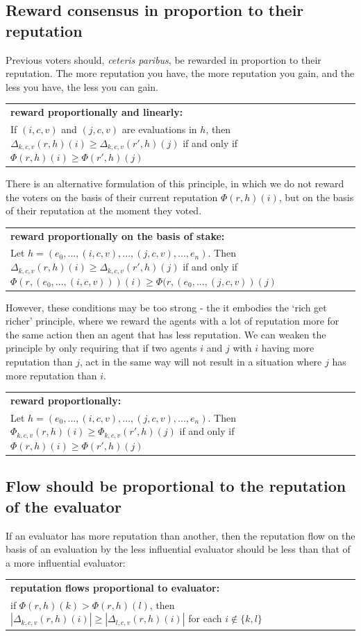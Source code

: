 \documentclass{article}
\newcommand{\flow}{\Phi}
\newenvironment{condition}[1]
	{
	\begin{center}
	   \begin{tabular}{|p{.9\textwidth}|}
		\hline \medskip
		{\bf #1:}\\
	}
	{
		\medskip \\\hline
	\end{tabular}
	\end{center}
	}
\begin{document}
\subsection{Reward consensus in proportion to their reputation}
Previous voters should, {\em ceteris paribus}, be rewarded in proportion to their reputation. The more reputation you have, the more reputation you gain, and the less you have, the less you can gain.
\begin{condition}{reward proportionally and linearly}
If $(i, c, v)$  and $(j, c, v)$ are evaluations in $h$, then $\Delta_{k, c, v}(r, h)(i) \geq \Delta_{k,c,v}(r', h)(j)$ if and only if $\flow(r, h)(i) \geq \flow(r', h)(j)$
\end{condition}
There is an alternative formulation of this principle, in which we do not reward the voters on the basis of their current reputation $\flow(r, h)(i)$, but on the basis of their reputation at the moment they voted.
\begin{condition}{reward proportionally on the basis of stake}
Let $h = (e_0, ..., (i, c, v), ..., (j, c, v), ..., e_n)$. Then $\Delta_{k, c, v}(r, h)(i) \geq \Delta_{k,c,v}(r', h)(j)$ if and only if $\flow(r, (e_0, ..., (i,c,v)))(i) \geq \flow(r, (e_0, ..., (j, c, v))(j)$ 
\end{condition}
However, these conditions may be too strong - the  it embodies the `rich get richer' principle, where we reward the agents with a lot of reputation more for the same action then an agent that has less reputation. We can weaken the principle by only requiring that if two agents $i$ and $j$ with $i$ having more reputation than $j$, act in the same way will not result in a situation where $j$ has more reputation than $i$.
\begin{condition}{reward proportionally}
Let $h = (e_0, ..., (i, c, v), ..., (j, c, v), ..., e_n)$. Then $\flow_{k, c, v}(r, h)(i) \geq \flow_{k,c,v}(r', h)(j)$ if and only if $\flow(r, h)(i) \geq \flow(r', h)(j)$ 
\end{condition}

\subsection{Flow should be proportional to the reputation of the evaluator}
If an evaluator has more reputation than another, then the reputation flow on the basis of an evaluation by the less influential evaluator should be less than that of a more influential evaluator:

\begin{condition}{reputation flows proportional to evaluator}
if $\flow(r, h)(k) > \flow(r, h)(l)$, then $|\Delta_{k, c, v}(r,h)(i)| \geq |\Delta_{l, c, v}(r,h)(i)|$ for each $i \not\in \{k, l \}$
\end{condition}
\end{document}
